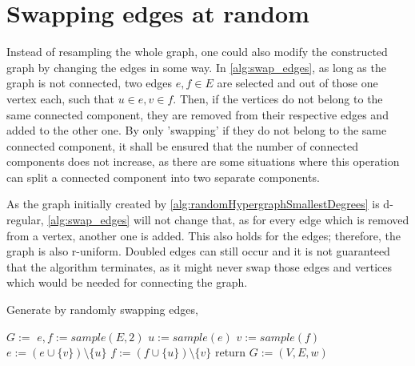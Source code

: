 \section{Swapping edges at random}
Instead of resampling the whole graph, one could also modify the constructed graph by changing the edges in some way. In \cref{alg:swap_edges}, as long as the graph is not connected, two edges $e,f \in E$ are selected and out of those one vertex each, such that $u\in e, v\in f$. Then, if the vertices do not belong to the same connected component, they are removed from their respective edges and added to the other one. By only 'swapping' if they do not belong to the same connected component, it shall be ensured that the number of connected components does not increase, as there are some situations where this operation can split a connected component into two separate components.

As the graph initially created by \cref{alg:randomHypergraphSmallestDegrees} is d-regular, \cref{alg:swap_edges} will not change that, as for every edge which is removed from a vertex, another one is added. This also holds for the edges; therefore, the graph is also r-uniform. Doubled edges can still occur and it is not guaranteed that the algorithm terminates, as it might never swap those edges and vertices which would be needed for connecting the graph.





	
\begin{algorithm}%
		\caption{Generate by randomly swapping edges, \label{alg:swap_edges}} 
		\begin{algorithmic}
			\State $G:=$ 
			\State $e,f := sample(E, 2)$
			\State $u := sample(e)$
			\State $v := sample(f)$
			\State $e := (e \cup \{v\}) \setminus \{u\}$
			\State $f := (f \cup \{u\}) \setminus \{v\}$
			\EndIf
			\EndWhile
			\State return $G:=(V,E, w)$	
			\EndFunction 
		\end{algorithmic}
	\end{algorithm}	
	
	
	
